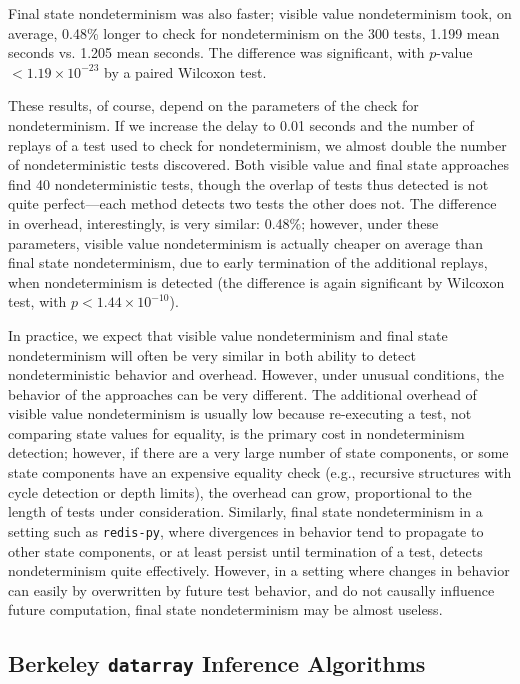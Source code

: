 Final state nondeterminism was also faster; visible value
nondeterminism took, on average, 0.48\% longer to check for
nondeterminism on the 300 tests, 1.199 mean seconds vs. 1.205 mean seconds.  The difference was significant, with
$p$-value $< 1.19 \times 10^{-23}$ by a paired Wilcoxon test.

These results, of course, depend on the parameters of the check for
nondeterminism.  If we increase the delay to 0.01 seconds and the
number of replays of a test used to check for nondeterminism, we
almost double the number of nondeterministic tests discovered.  Both
visible value and final state approaches find 40 nondeterministic
tests, though the overlap of tests thus detected is not quite perfect---each method detects two tests the other does not.  The difference
in overhead, interestingly, is very similar:  0.48\%; however, under
these parameters, visible value nondeterminism is actually cheaper on average
than final state nondeterminism, due to early termination of the
additional replays, when nondeterminism is detected (the difference is
again significant by Wilcoxon test, with $p < 1.44 \times 10^{-10}$).

In practice, we expect that visible value nondeterminism and final state
nondeterminism will often be very similar in both ability to detect
nondeterministic behavior and overhead.  However, under unusual
conditions, the behavior of the approaches can be very different.  The
additional overhead of visible value nondeterminism is usually low
because re-executing a test, not comparing state values for equality, is
the primary cost in nondeterminism detection; however, if there are a
very large number of state components, or some state components have
an expensive equality check (e.g., recursive structures with cycle
detection or depth limits), the overhead can grow, proportional to the
length of tests under consideration.  Similarly, final state
nondeterminism in a setting such as {\tt redis-py}, where divergences
in behavior tend to propagate to other state components, or at least
persist until termination of a test, detects nondeterminism quite
effectively.  However, in a setting where changes in behavior can
easily by overwritten by future test behavior, and do not causally
influence future computation, final state nondeterminism may be almost useless.

\subsection{Berkeley {\tt datarray} Inference Algorithms}


